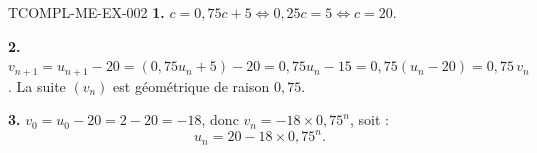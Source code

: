 \begin{corrige}{TCOMPL-ME-EX-002}
\textbf{1.} $c = 0{,}75c+5 \iff 0{,}25c=5 \iff c=20$.

\textbf{2.} $v_{n+1} = u_{n+1}-20 = (0{,}75u_n+5)-20 = 0{,}75u_n - 15 = 0{,}75(u_n-20) = 0{,}75\,v_n$. La suite $(v_n)$ est géométrique de raison $0{,}75$.

\textbf{3.} $v_0 = u_0-20 = 2-20=-18$, donc $v_n = -18 \times 0{,}75^n$, soit :
\[
  u_n = 20 - 18 \times 0{,}75^n.
\]
\end{corrige}
